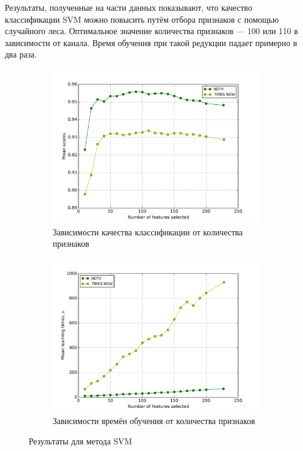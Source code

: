 \par
Результаты, полученные на части данных показывают, что качество классификации SVM можно повысить путём отбора признаков с помощью случайного леса. Оптимальное значение количества признаков --- 100 или 110 в зависимости от канала. Время обучения при такой редукции падает примерно в два раза.

\begin{figure}[h!]
    \centering
	\begin{subfigure}{0.45\textwidth}
		\includegraphics[width=\textwidth]{images/RFS-SVM.png}
		\caption{Зависимости качества классификации от количества признаков}
	\end{subfigure}
	\begin{subfigure}{0.45\textwidth}
		\includegraphics[width=\textwidth]{images/RFS-SVMTime.png}
		\caption{Зависимости времён обучения от количества признаков}
	\end{subfigure}
	\caption{Результаты для метода SVM}\label{fig:svm_rfs}
\end{figure}

